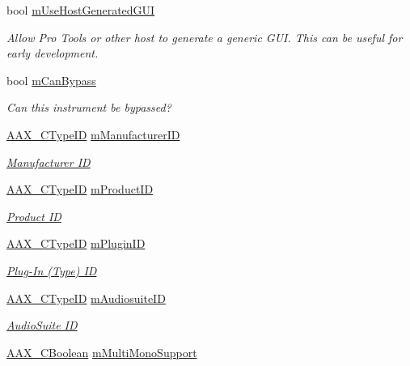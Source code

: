 \begin{DoxyCompactItemize}
bool \hyperlink{a00124_a38bf1193daf9ebd4b0643dec21507caa}{m\+Use\+Host\+Generated\+G\+U\+I}
\begin{DoxyCompactList}\small\item\em Allow Pro Tools or other host to generate a generic G\+U\+I. This can be useful for early development. \end{DoxyCompactList}\item 
bool \hyperlink{a00124_a849b67e9badf7ca38a506f8010d4fff1}{m\+Can\+Bypass}
\begin{DoxyCompactList}\small\item\em Can this instrument be bypassed? \end{DoxyCompactList}\item 
\hyperlink{a00149_ac678f9c1fbcc26315d209f71a147a175}{A\+A\+X\+\_\+\+C\+Type\+I\+D} \hyperlink{a00124_ab28a76c6e5d7860d20b699869c108c84}{m\+Manufacturer\+I\+D}
\begin{DoxyCompactList}\small\item\em \hyperlink{a00283_a6571f4e41a5dd06e4067249228e2249ea996465cca29a2a15291d1c788ac5728c}{Manufacturer I\+D} \end{DoxyCompactList}\item 
\hyperlink{a00149_ac678f9c1fbcc26315d209f71a147a175}{A\+A\+X\+\_\+\+C\+Type\+I\+D} \hyperlink{a00124_a139f8dc96e73b88a1e9f6abdfe7112c3}{m\+Product\+I\+D}
\begin{DoxyCompactList}\small\item\em \hyperlink{a00283_a6571f4e41a5dd06e4067249228e2249ea3a41fcdff5af1a4fd19dcbca7b1ba6f3}{Product I\+D} \end{DoxyCompactList}\item 
\hyperlink{a00149_ac678f9c1fbcc26315d209f71a147a175}{A\+A\+X\+\_\+\+C\+Type\+I\+D} \hyperlink{a00124_a80d2c48d5a97190ed2ebec043d073142}{m\+Plugin\+I\+D}
\begin{DoxyCompactList}\small\item\em \hyperlink{a00283_a6571f4e41a5dd06e4067249228e2249ea89ca3dd6e96895cda14976c1b1ceb826}{Plug-\/\+In (Type) I\+D} \end{DoxyCompactList}\item 
\hyperlink{a00149_ac678f9c1fbcc26315d209f71a147a175}{A\+A\+X\+\_\+\+C\+Type\+I\+D} \hyperlink{a00124_a9feeadf3348cf1b4ce13008d3a02aaef}{m\+Audiosuite\+I\+D}
\begin{DoxyCompactList}\small\item\em \hyperlink{a00283_a6571f4e41a5dd06e4067249228e2249ead3344696b8298a8b254add3d039ea927}{Audio\+Suite I\+D} \end{DoxyCompactList}\item 
\hyperlink{a00149_aa216506530f1d19a2965931ced2b274b}{A\+A\+X\+\_\+\+C\+Boolean} \hyperlink{a00124_a0803c641f72241bea5d7cf984c6263ca}{m\+Multi\+Mono\+Support}
\end{DoxyCompactItemize}


